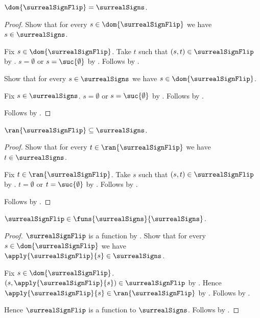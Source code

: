 \begin{proposition}\label{surreal_sign_flip_domain}
    $\dom{\surrealSignFlip}=\surrealSigns$.
\end{proposition}
\begin{proof}
    Show that for every $s\in\dom{\surrealSignFlip}$ we have
        $s\in\surrealSigns$.
    \begin{subproof}
        Fix $s\in\dom{\surrealSignFlip}$.
        Take $t$ such that $(s,t)\in\surrealSignFlip$
            by .
        $s=\emptyset$ or $s=\suc{\emptyset}$
            by .
        Follows by .
    \end{subproof}
    Show that for every $s\in\surrealSigns$ we have
        $s\in\dom{\surrealSignFlip}$.
    \begin{subproof}
        Fix $s\in\surrealSigns$.
        $s=\emptyset$ or $s=\suc{\emptyset}$
            by .
        Follows by .
    \end{subproof}
    Follows by .
\end{proof}

\begin{proposition}\label{surreal_sign_flip_range}
    $\ran{\surrealSignFlip}\subseteq\surrealSigns$.
\end{proposition}
\begin{proof}
    Show that for every $t\in\ran{\surrealSignFlip}$ we have
        $t\in\surrealSigns$.
    \begin{subproof}
        Fix $t\in\ran{\surrealSignFlip}$.
        Take $s$ such that $(s,t)\in\surrealSignFlip$
            by .
        $t=\emptyset$ or $t=\suc{\emptyset}$
            by .
        Follows by .
    \end{subproof}
    Follows by .
\end{proof}

\begin{proposition}\label{surreal_sign_flip_type}
    $\surrealSignFlip\in\funs{\surrealSigns}{\surrealSigns}$.
\end{proposition}
\begin{proof}
    $\surrealSignFlip$ is a function
        by .
    Show that for every $s\in\dom{\surrealSignFlip}$ we have
        $\apply{\surrealSignFlip}{s}\in\surrealSigns$.
    \begin{subproof}
        Fix $s\in\dom{\surrealSignFlip}$.
        $(s,\apply{\surrealSignFlip}{s})\in\surrealSignFlip$
            by .
        Hence $\apply{\surrealSignFlip}{s}\in\ran{\surrealSignFlip}$
            by .
        Follows by .
    \end{subproof}
    Hence $\surrealSignFlip$ is a function to $\surrealSigns$.
    Follows by .
\end{proof}

